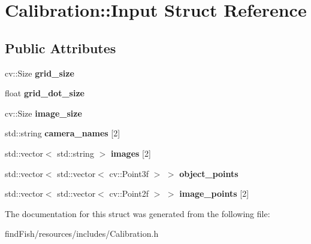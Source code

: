 \hypertarget{struct_calibration_1_1_input}{}\section{Calibration\+::Input Struct Reference}
\label{struct_calibration_1_1_input}
\subsection*{Public Attributes}
\begin{DoxyCompactItemize}
\item 
\mbox{\label{struct_calibration_1_1_input_a7ce7449082dfb5b409945e3db5ded4e2}} 
cv\+::\+Size {\bfseries grid\+\_\+size}
\item 
\mbox{\label{struct_calibration_1_1_input_aeab5143ddd6b96d90b548a070a60d5d2}} 
float {\bfseries grid\+\_\+dot\+\_\+size}
\item 
\mbox{\label{struct_calibration_1_1_input_ab41c52b1462f6bd26d9c94a2e3a7bdc3}} 
cv\+::\+Size {\bfseries image\+\_\+size}
\item 
\mbox{\label{struct_calibration_1_1_input_aa0316954e4b43302be303e5ff1123991}} 
std\+::string {\bfseries camera\+\_\+names} \mbox{[}2\mbox{]}
\item 
\mbox{\label{struct_calibration_1_1_input_a68bcda4e1615ef17429c71a5a48e41a7}} 
std\+::vector$<$ std\+::string $>$ {\bfseries images} \mbox{[}2\mbox{]}
\item 
\mbox{\label{struct_calibration_1_1_input_ac5e7010d843df1fa6290078d2c0d0be1}} 
std\+::vector$<$ std\+::vector$<$ cv\+::\+Point3f $>$ $>$ {\bfseries object\+\_\+points}
\item 
\mbox{\label{struct_calibration_1_1_input_aa0a412c5922967581f00ddfbb3eec5f8}} 
std\+::vector$<$ std\+::vector$<$ cv\+::\+Point2f $>$ $>$ {\bfseries image\+\_\+points} \mbox{[}2\mbox{]}
\end{DoxyCompactItemize}


The documentation for this struct was generated from the following file\+:\begin{DoxyCompactItemize}
\item 
find\+Fish/resources/includes/Calibration.\+h\end{DoxyCompactItemize}
